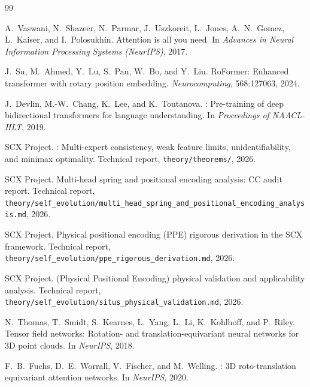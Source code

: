 \documentclass[11pt,a4paper]{article}
\theoremstyle{remark}
\begin{document}
\begin{thebibliography}{99}

A.~Vaswani, N.~Shazeer, N.~Parmar, J.~Uszkoreit, L.~Jones, A.~N.~Gomez,
L.~Kaiser, and I.~Polosukhin.
\newblock Attention is all you need.
\newblock In \emph{Advances in Neural Information Processing Systems (NeurIPS)},
  2017.

J.~Su, M.~Ahmed, Y.~Lu, S.~Pan, W.~Bo, and Y.~Liu.
\newblock Ro{Former}: Enhanced transformer with rotary position embedding.
\newblock \emph{Neurocomputing}, 568:127063, 2024.

J.~Devlin, M.-W.~Chang, K.~Lee, and K.~Toutanova.
: Pre-training of deep bidirectional transformers for language
  understanding.
\newblock In \emph{Proceedings of NAACL-HLT}, 2019.

SCX Project.
: Multi-expert consistency, weak feature limits,
  unidentifiability, and minimax optimality.
\newblock Technical report, \texttt{theory/theorems/}, 2026.

SCX Project.
\newblock Multi-head spring and positional encoding analysis: {CC} audit report.
\newblock Technical report,
  \texttt{theory/self\_evolution/multi\_head\_spring\_and\_positional\_encoding\_analysis.md},
  2026.

SCX Project.
\newblock Physical positional encoding ({PPE}) rigorous derivation in the {SCX}
  framework.
\newblock Technical report,
  \texttt{theory/self\_evolution/ppe\_rigorous\_derivation.md}, 2026.

SCX Project.
 ({Physical Positional Encoding}) physical validation and
  applicability analysis.
\newblock Technical report, \texttt{theory/self\_evolution/situs\_physical\_validation.md},
  2026.

N.~Thomas, T.~Smidt, S.~Kearnes, L.~Yang, L.~Li, K.~Kohlhoff, and P.~Riley.
\newblock Tensor field networks: Rotation- and translation-equivariant neural
  networks for {3D} point clouds.
\newblock In \emph{NeurIPS}, 2018.

F.~B.~Fuchs, D.~E.~Worrall, V.~Fischer, and M.~Welling.
: {3D} roto-translation equivariant attention
  networks.
\newblock In \emph{NeurIPS}, 2020.


\end{thebibliography}
\end{document}
